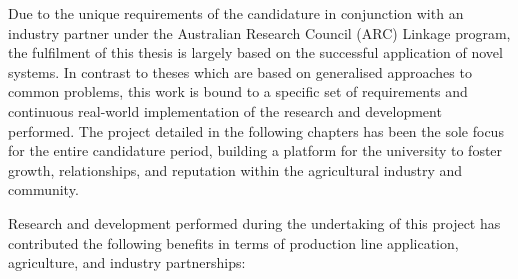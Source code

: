 \documentclass[fleqn,twoside,12pt]{report}
\begin{document}
Due to the unique requirements of the candidature in conjunction with an industry partner under the Australian Research Council (ARC) Linkage program, the fulfilment of this thesis is largely based on the successful application of novel systems. In contrast to theses which are based on generalised approaches to common problems, this work is bound to a specific set of requirements and continuous real-world implementation of the research and development performed. The project detailed in the following chapters has been the sole focus for the entire candidature period, building a platform for the university to foster growth, relationships, and reputation within the agricultural industry and community.


Research and development performed during the undertaking of this project has contributed the following benefits in terms of production line application, agriculture, and industry partnerships:
\end{document}
